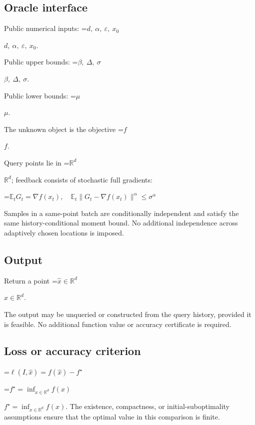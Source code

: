 \documentclass[10pt,a4paper]{article}
\newcommand{\AtlasMath}[1]{\par\begingroup\centering\setbox0=\hbox{$\displaystyle #1$}\ifdim\wd0>1.4\linewidth\typeout{ATLAS WIDE FORMULA: \the\wd0}\fi\ifdim\wd0>\linewidth\resizebox{\linewidth}{!}{\box0}\else\box0\fi\par\endgroup}
\newcommand{\AtlasInlineMath}[1]{\begingroup\setbox0=\hbox{$#1$}\ifdim\wd0>.4\linewidth\endgroup\AtlasMath{#1}\else\endgroup$#1$\fi}
\begin{document}
\subsection{Oracle interface}


Public numerical inputs: \AtlasInlineMath{d,\ \alpha,\ \varepsilon,\ x_0}.



Public upper bounds: \AtlasInlineMath{\beta,\ \Delta,\ \sigma}.



Public lower bounds: \AtlasInlineMath{\mu}.



The unknown object is the objective \AtlasInlineMath{f}.



Query points lie in \AtlasInlineMath{\mathbb{R}^d}; feedback consists of stochastic full gradients:




\AtlasMath{\mathbb{E}_tG_t=\nabla f(x_t),\quad\mathbb{E}_t\|G_t-\nabla f(x_t)\|^\alpha\le\sigma^\alpha}




Samples in a same-point batch are conditionally independent and satisfy the same history-conditional moment bound. No additional independence across adaptively chosen locations is imposed.



\subsection{Output}


Return a point \AtlasInlineMath{\widehat x\in\mathbb R^d}.



The output may be unqueried or constructed from the query history, provided it is feasible. No additional function value or accuracy certificate is required.



\subsection{Loss or accuracy criterion}



\AtlasMath{\ell(I,\widehat{x})=f(\widehat{x})-f^\star}




\AtlasInlineMath{f^\star=\inf_{x\in \mathbb{R}^d}f(x)}. The existence, compactness, or initial-suboptimality assumptions ensure that the optimal value in this comparison is finite.
\end{document}
